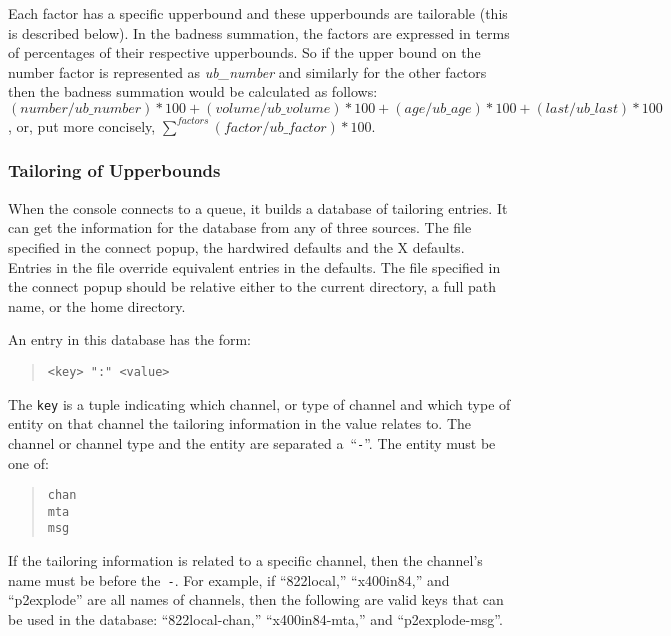 Each factor has a specific upperbound and these upperbounds are
tailorable (this is described below).
In the badness summation, the factors are expressed in terms of
percentages of their respective upperbounds.
So if the upper bound on the number factor is represented as {\em
ub\_number} and similarly for the other factors then the badness
summation would be calculated as follows:
\begin{math}
(number/ub\_number)*100 + (volume/ub\_volume)*100 + (age/ub\_age)*100
+ (last/ub\_last)*100
\end{math},
or, put more concisely, \(\sum^{factors}(factor/ub\_factor)*100\).

\subsubsection	{Tailoring of Upperbounds}

When the console connects to a queue, it builds a database of
tailoring entries.
It can get the information for the database from any of three sources.
The file specified in the connect popup, the hardwired defaults and
the X defaults.
Entries in the file override equivalent entries in the defaults.
The file specified in the connect popup should be relative either to
the current directory, a full path name, or the home directory.

An entry in this database has the form:
\begin{quote}\small\begin{verbatim}
<key> ":" <value>
\end{verbatim}\end{quote}

The \verb+key+ is a tuple indicating which channel, or type of channel and
which type of entity on that channel the tailoring information in the
value relates to. 
The channel or channel type and the entity are separated a~``\verb+-+''.
The entity must be one of:
\begin{quote}\small\begin{verbatim}
chan
mta
msg
\end{verbatim}\end{quote}
If the tailoring information is related to a specific channel, then
the channel's name must be before the~\verb+-+.
For example, if ``822local,'' ``x400in84,'' and ``p2explode'' are all
names of channels, then the following are valid keys that can be used
in the database: ``822local-chan,'' ``x400in84-mta,'' and
``p2explode-msg''.

